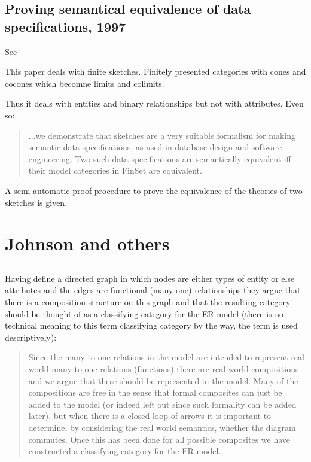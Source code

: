 \documentclass[10pt,a4paper]{scrartcl}
\begin{document}
\subsection{Proving semantical equivalence of data specifications, 1997}
See \cite{piessens1997}

This paper deals with finite sketches. Finitely presented categories with cones and cocones which becomne limits and colimits.

Thus it deals with entities and binary relationships but not with attributes. Even so:
\begin{quote}
...we demonstrate that sketches are a very suitable
formalism for making semantic data specifications, as used in database design and software
engineering. Two such data specifications are semantically equivalent iff their model categories in
FinSet are equivalent. 
\end{quote}

A semi-automatic proof
procedure to prove the equivalence of the theories of two sketches is given.



\section {Johnson and others}
\subsection{\cite{Johnson93}      }
Having define a directed graph in which nodes are either types of entity or
else attributes and the edges are functional (many-one) relationships
they argue that there is a composition structure on this graph
and that the resulting category should be thought of as a classifying category
for the ER-model (there is no technical meaning to this term classifying category by the way, 
the term is used descriptively):
\begin{quote}
Since the many-to-one relations in the
model are intended to represent real world many-to-one relations (functions)
there are real world compositions and we argue that these should be represented
in the model. Many of the compositions are free in the sense that formal 
composites can just be added to the model (or indeed left out since such formality
can be added later), but when there is a closed loop of arrows it is important to
determine, by considering the real world semantics, whether the diagram commutes. 
Once this has been done for all possible composites we have constructed
a classifying category for the ER-model.
\end{quote}
\end{document}
